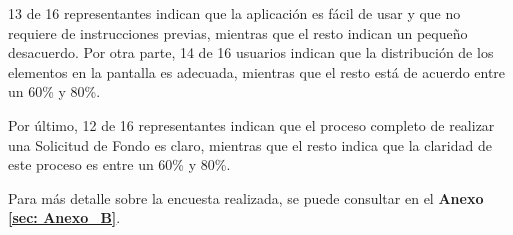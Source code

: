 13 de 16 representantes indican que la aplicación es fácil de usar y que no requiere de instrucciones previas, mientras que el resto indican un pequeño desacuerdo. Por otra parte, 14 de 16 usuarios indican que la distribución de los elementos en la pantalla es adecuada, mientras que el resto está de acuerdo entre un 60\% y 80\%.

Por último, 12 de 16 representantes indican que el proceso completo de realizar una Solicitud de Fondo es claro, mientras que el resto indica que la claridad de este proceso es entre un 60\% y 80\%.

Para más detalle sobre la encuesta realizada, se puede consultar en el \textbf{Anexo \ref{sec: Anexo_B}}.


